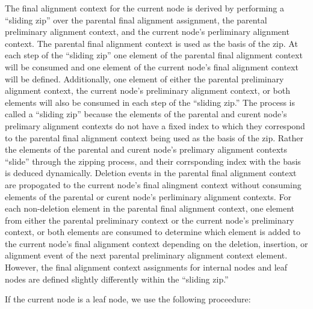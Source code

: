 \documentclass[11pt]{article}
\begin{document}
The final alignment context for the current node is derived by performing a ``sliding zip'' over the parental final alignment assignment, the parental preliminary alignment context, and the current node's perliminary alignment context.
The parental final alignment context is used as the basis of the zip.
At each step of the ``sliding zip'' one element of the parental final alignment context will be consumed and one element of the current node's final alignment context will be defined.
Additionally, one element of either the parental preliminary alignment context, the current node's preliminary alignment context, or both elements will also be consumed in each step of the ``sliding zip.''
The process is called a ``sliding zip'' because the elements of the parental and curent node's prelimary alignment contexts do not have a fixed index to which they correspond to the parental final alignment context being used as the basis of the zip.
Rather the elements of the parental and curent node's prelimary alignment contexts ``slide'' through the zipping process, and their corrsponding index with the basis is deduced dynamically.
Deletion events in the parental final alignment context are propogated to the current node's final alingment context without consuming elements of the parental or curent node's perliminary alignment contexts.
For each non-deletion element in the parental final alignment context, one element from either the parental preliminary context or the current node's preliminary context, or both elements are consumed to determine which element is added to the current node's final alignment context depending on the deletion, insertion, or alignment event of the next parental preliminary alignment context element.
However, the final alignment context assignments for internal nodes and leaf nodes are defined slightly differently within the ``sliding zip.''

If the current node is a leaf node, we use the following proceedure:
\end{document}
